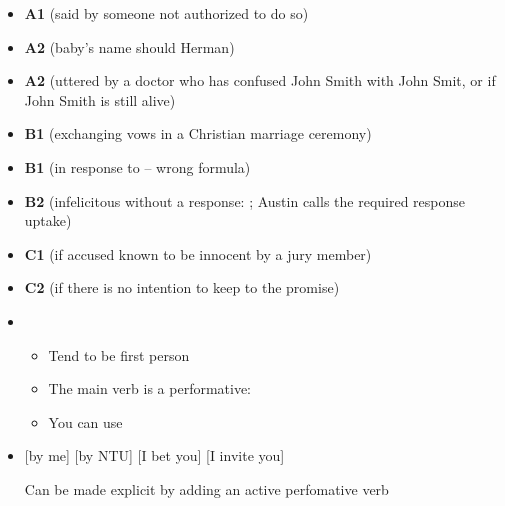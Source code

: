 \documentclass[headrule,footrule]{foils}
\begin{document}
\begin{itemize} \addtolength{\itemsep}{-2ex}
\item \textbf{A1}  (said by someone not authorized to do so)
\item \textbf{A2}  (baby’s name should Herman)
\item \textbf{A2}  (uttered by a doctor who has confused John Smith
with John Smit, or if John Smith is still alive)
\item \textbf{B1}
 (exchanging vows in a Christian marriage ceremony)
\item \textbf{B1}
 (in response to  – wrong formula)
\item \textbf{B2}
 (infelicitous without a response: ; Austin calls the required response uptake)
\item \textbf{C1}
 (if accused known to be innocent by a jury member)
\item \textbf{C2}
 (if there is no intention to keep to the promise)
\end{itemize}


\begin{itemize}
\item {}
  \begin{itemize}
  \item Tend to be first person
  \item The main verb  is a performative: 
  \item You can use 
  \end{itemize}
\item {}
  \begin{exe}
    \ex {} [by me]
    \ex {} [by NTU]
    \ex {} [I bet you] 
    \ex {} [I invite you]
  \end{exe}
  Can be made explicit by adding an active perfomative verb
\end{itemize}
\end{document}
